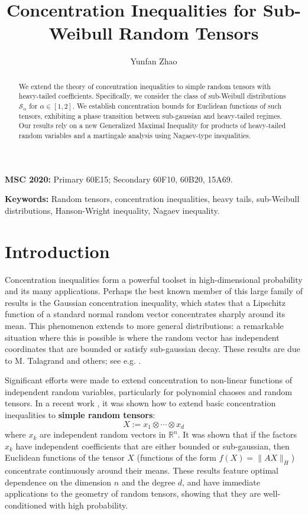 \documentclass[11pt]{amsart}
\title{Concentration Inequalities for Sub-Weibull Random Tensors}
\author{Yunfan Zhao}
\date{} %
\theoremstyle{definition}
\theoremstyle{remark}
\begin{document}
\begin{abstract}
We extend the theory of concentration inequalities to simple random tensors with heavy-tailed coefficients. Specifically, we consider the class of sub-Weibull distributions $\mathcal{S}_\alpha$ for $\alpha \in [1, 2]$. We establish concentration bounds for Euclidean functions of such tensors, exhibiting a phase transition between sub-gaussian and heavy-tailed regimes. Our results rely on a new Generalized Maximal Inequality for products of heavy-tailed random variables and a martingale analysis using Nagaev-type inequalities.
\end{abstract}

\maketitle

\noindent \textbf{MSC 2020:} Primary 60E15; Secondary 60F10, 60B20, 15A69.

\vspace{0.5em}

\noindent \textbf{Keywords:} Random tensors, concentration inequalities, heavy tails, sub-Weibull distributions, Hanson-Wright inequality, Nagaev inequality.

\section{Introduction}

Concentration inequalities form a powerful toolset in high-dimensional probability and its many applications. Perhaps the best known member of this large family of results is the Gaussian concentration inequality, which states that a Lipschitz function of a standard normal random vector concentrates sharply around its mean. This phenomenon extends to more general distributions: a remarkable situation where this is possible is where the random vector has independent coordinates that are bounded or satisfy sub-gaussian decay. These results are due to M. Talagrand \cite{Talagrand1996} and others; see e.g. \cite{Boucheron2013, Ledoux2001}.

Significant efforts were made to extend concentration to non-linear functions of independent random variables, particularly for polynomial chaoses and random tensors. In a recent work \cite{Vershynin2020}, it was shown how to extend basic concentration inequalities to \textbf{simple random tensors}:
\[
X := x_1 \otimes \cdots \otimes x_d
\]
where $x_k$ are independent random vectors in $\mathbb{R}^n$. It was shown that if the factors $x_k$ have independent coefficients that are either bounded or sub-gaussian, then Euclidean functions of the tensor $X$ (functions of the form $f(X) = \|AX\|_H$) concentrate continuously around their means. These results feature optimal dependence on the dimension $n$ and the degree $d$, and have immediate applications to the geometry of random tensors, showing that they are well-conditioned with high probability.
\end{document}

